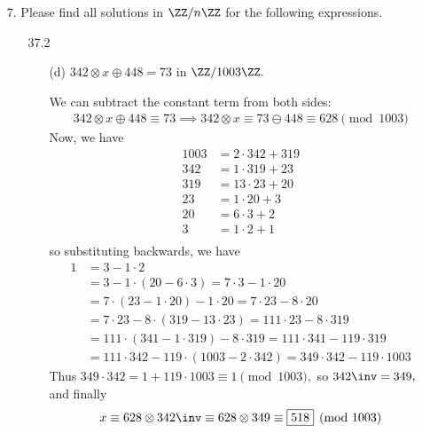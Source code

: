 \documentclass{article}
\begin{document}
\begin{itemize}
		\newpage

	\item[7.] Please find all solutions in $\ZZ/n\ZZ$ for the following expressions. 
		\begin{itemize}
			\item[37.2] 
				\begin{itemize}
					\item[(d)] $342\otimes x\oplus 448 = 73$ in $\ZZ/1003\ZZ.$
						\begin{soln}
							We can subtract the constant term from both sides:
							\begin{align*}
								342\otimes x\oplus 448 \equiv 73\implies 342\otimes x \equiv 73\ominus 448 \equiv 628 \pmod {1003}
							\end{align*}
							Now, we have
							\begin{align*}
								1003 &= 2\cdot342 + 319 \\
								342 &= 1\cdot319 + 23 \\
								319 &= 13\cdot23 + 20 \\
								23 &= 1\cdot20 + 3 \\
								20 &= 6\cdot 3 + 2 \\
								3 &= 1\cdot 2 + 1 \\
							\end{align*}
							so substituting backwards, we have
							\begin{align*}
								1 &= 3-1\cdot 2 \\
								&= 3-1\cdot(20-6\cdot 3) = 7\cdot 3 - 1\cdot 20 \\
								&= 7\cdot(23-1\cdot 20) - 1\cdot 20 = 7\cdot 23 - 8\cdot 20 \\
								&= 7\cdot23 - 8\cdot(319 - 13\cdot 23) = 111\cdot 23 - 8\cdot 319 \\
								&= 111\cdot (341 - 1\cdot 319) - 8\cdot 319 = 111\cdot 341 - 119\cdot 319 \\
								&= 111\cdot 342 - 119\cdot(1003-2\cdot 342) = 349\cdot 342 - 119\cdot 1003
							\end{align*}
							Thus $349\cdot 342 = 1 + 119\cdot 1003 \equiv 1\pmod {1003},$ so $342\inv=349,$ and finally
							\begin{align*}
								x \equiv 628\otimes 342\inv\equiv 628\otimes 349 \equiv \boxed{518}\pmod{1003}
							\end{align*}
						\end{soln}
						
				\end{itemize}


\end{itemize}
\end{itemize}
\end{document}
